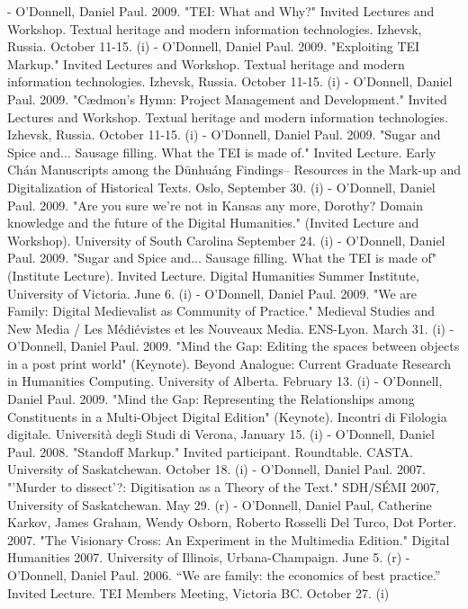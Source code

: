 - O'Donnell, Daniel Paul. 2009. "TEI: What and Why?" Invited Lectures and Workshop. Textual heritage and modern information technologies. Izhevsk, Russia. October 11-15. (i)
- O'Donnell, Daniel Paul. 2009. "Exploiting TEI Markup." Invited Lectures and Workshop. Textual heritage and modern information technologies. Izhevsk, Russia. October 11-15. (i)
- O'Donnell, Daniel Paul. 2009. "Cædmon's Hymn: Project Management and Development." Invited Lectures and Workshop. Textual heritage and modern information technologies. Izhevsk, Russia. October 11-15. (i)
- O'Donnell, Daniel Paul. 2009. "Sugar and Spice and... Sausage filling. What the TEI is made of." Invited Lecture.     Early Chán Manuscripts among the Dūnhuáng Findings– Resources in the Mark-up and Digitalization of Historical Texts. Oslo, September 30. (i)
- O'Donnell, Daniel Paul. 2009. "Are you sure we're not in Kansas any more, Dorothy? Domain knowledge and the future of the Digital Humanities." (Invited Lecture and Workshop). University of South Carolina September 24. (i)
- O'Donnell, Daniel Paul. 2009. "Sugar and Spice and... Sausage filling. What the TEI is made of" (Institute Lecture). Invited Lecture. Digital Humanities Summer Institute, University of Victoria. June 6. (i)
- O'Donnell, Daniel Paul. 2009. "We are Family: Digital Medievalist as Community of Practice." Medieval Studies and New Media /\allowbreak{} Les Médiévistes et les Nouveaux Media. ENS-Lyon. March 31. (i)
- O'Donnell, Daniel Paul. 2009. "Mind the Gap: Editing the spaces between objects in a post print world" (Keynote). Beyond Analogue: Current Graduate Research in Humanities Computing. University of Alberta. February 13. (i)
- O'Donnell, Daniel Paul. 2009. "Mind the Gap: Representing the Relationships among Constituents in a Multi-Object Digital Edition" (Keynote). Incontri di Filologia digitale. Università degli Studi di Verona, January 15. (i)
- O'Donnell, Daniel Paul. 2008. "Standoff Markup." Invited participant. Roundtable. CASTA. University of Saskatchewan. October 18. (i)
- O'Donnell, Daniel Paul. 2007. "'Murder to dissect'?: Digitisation as a Theory of the Text." SDH/\allowbreak{}SÉMI 2007, University of Saskatchewan. May 29. (r)
- O'Donnell, Daniel Paul, Catherine Karkov, James Graham, Wendy Osborn, Roberto Rosselli Del Turco, Dot Porter. 2007. "The Visionary Cross: An Experiment in the Multimedia Edition." Digital Humanities 2007. University of Illinois, Urbana-Champaign. June 5. (r)
- O'Donnell, Daniel Paul. 2006. “We are family: the economics of best practice.” Invited Lecture. TEI Members Meeting, Victoria BC. October 27. (i)
